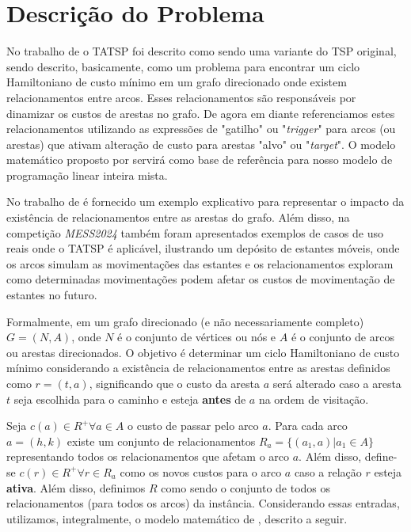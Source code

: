\chapter{Descrição do Problema}
\label{chap:problem_description}

\noindent No trabalho de \textcite{Carmine2024} o TATSP foi descrito como sendo uma variante do TSP original, sendo descrito, basicamente, como um problema para encontrar um ciclo Hamiltoniano de custo mínimo em um grafo direcionado onde existem relacionamentos entre arcos. Esses relacionamentos são responsáveis por dinamizar os custos de arestas no grafo. De agora em diante referenciamos estes relacionamentos utilizando as expressões de "gatilho" ou "\emph{trigger}" para arcos (ou arestas) que ativam alteração de custo para arestas "alvo" ou "\emph{target}". O modelo matemático proposto por \textcite{Carmine2024} servirá como base de referência para nosso modelo de programação linear inteira mista.

No trabalho de \textcite{Carmine2024} é fornecido um exemplo explicativo para representar o impacto da existência de relacionamentos entre as arestas do grafo. Além disso, na competição \emph{MESS2024}  também foram apresentados exemplos de casos de uso reais onde o TATSP é aplicável, ilustrando um depósito de estantes móveis, onde os arcos simulam as movimentações das estantes e os relacionamentos exploram como determinadas movimentações podem afetar os custos de movimentação de estantes no futuro.

Formalmente, em um grafo direcionado (e não necessariamente completo) $G = (N, A)$, onde $N$ é o conjunto de vértices ou nós e $A$ é o conjunto de arcos ou arestas direcionados. O objetivo é determinar um ciclo Hamiltoniano de custo mínimo considerando a existência de relacionamentos entre as arestas definidos como $r = (t, a)$, significando que o custo da aresta $a$ será alterado caso a aresta $t$ seja escolhida para o caminho e esteja \textbf{antes} de $a$ na ordem de visitação.

Seja $c(a) \in R^{+} \forall a \in A$ o custo de passar pelo arco $a$. Para cada arco $a = (h,k)$ existe um conjunto de relacionamentos $R_a = \{(a_1, a) | a_1 \in A\}$ representando todos os relacionamentos que afetam o arco $a$. Além disso, define-se $c(r) \in R^{+} \forall r \in R_a$ como os novos custos para o arco $a$ caso a relação $r$ esteja \textbf{ativa}. Além disso, definimos $R$ como sendo o conjunto de todos os relacionamentos (para todos os arcos) da instância. Considerando essas entradas, utilizamos, integralmente, o modelo matemático de \textcite{Carmine2024}, descrito a seguir.


